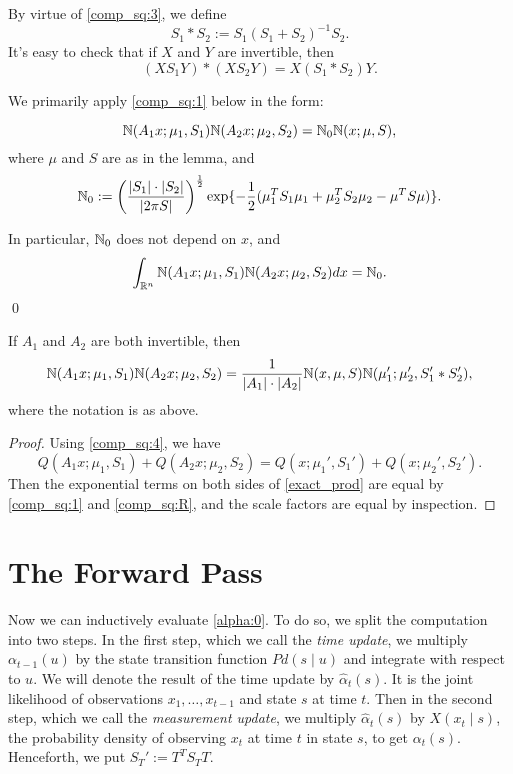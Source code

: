\documentclass[12pt,leqno]{article}
\begin{document}
By virtue of \eqref{comp_sq:3}, we define
$$
S_1*S_2 := S_1(S_1+S_2)^{-1}S_2.
$$
It's easy to check that if $X$ and $Y$ are invertible, then
\begin{equation}\label{comp_sq:XY}
  (XS_1Y)*(XS_2Y) = X(S_1*S_2)Y. 
\end{equation}

We primarily apply \eqref{comp_sq:1} below in the form: 
\begin{Cor}\label{comp_sq:2}
$$
  {\mathbb N}(A_1x;\mu_1,S_1){\mathbb N}(A_2x;\mu_2,S_2) = {\mathbb N}_0{\mathbb N}(x;\mu,S),
  $$
where $\mu$ and $S$ are as in the lemma, and 
$$
{\mathbb N}_0 := \left(\frac{|S_1|\cdot|S_2|}{|2\pi{S}|}\right)^{\frac{1}{2}}\exp\{-\frac{1}{2}(\mu_1^TS_1\mu_1 + \mu_2^TS_2\mu_2-\mu^TS\mu)\}.
$$

In particular, ${\mathbb N}_0$ does not depend on $x$, and
\begin{equation}\label{comp_sq:int}
  \int_{{\mathbb R}^{n}}  {\mathbb N}(A_1x;\mu_1,S_1){\mathbb N}(A_2x;\mu_2,S_2)dx = {\mathbb N}_0.
\end{equation}
\qed
\end{Cor}

\begin{Cor}\label{exact_prod} 
 If $A_1$ and $A_2$ are both invertible, then 
$$
 {\mathbb N}(A_1x;\mu_1,S_1){\mathbb N}(A_2x;\mu_2,S_2)   = \frac{1}{|A_1|\cdot|A_2|}{\mathbb N}(x,\mu,S){\mathbb N}(\mu_1';\mu_2',S_1'*S_2'),
$$
 where the notation is as above.
\end{Cor}
\begin{proof}

  Using \eqref{comp_sq:4}, we have
$$
  Q(A_1x;\mu_1,S_1) + Q(A_2x;\mu_2,S_2)  = Q(x;\mu_1',S_1') + Q(x;\mu_2',S_2').
$$
  Then the exponential terms on both sides of \eqref{exact_prod} are equal by
  \eqref{comp_sq:1} and \eqref{comp_sq:R}, and the scale factors are equal by inspection.
\end{proof}


\section{The Forward Pass}
  Now we can inductively evaluate \eqref{alpha:0}. To do so, we split the computation
  into two steps.  In the first step, which we call the {\em time update}, we multiply
  $\alpha_{t-1}(u)$ by the state transition function $Pd(s\mid u)$ and integrate with respect
  to $u$. We will denote the result of the time update by $\hat{\alpha}_t(s)$.  It is the joint 
  likelihood of observations $x_1,\dots,x_{t-1}$ and state $s$ at time $t$.
  Then in the second step, which we call the {\em measurement update}, we multiply
  $\hat{\alpha}_t(s)$ by $X(x_t \mid s)$, the probability density of observing $x_t$ at time $t$
  in state $s$, to get $\alpha_t(s)$.  Henceforth, we put $S_T' := T^TS_TT$.
\end{document}
